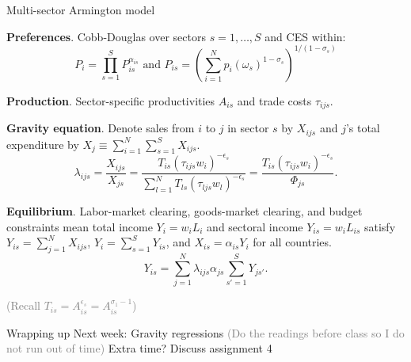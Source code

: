 \documentclass[10pt,notes=hide,aspectratio=169]{beamer}
\begin{document}
\begin{frame}{Multi-sector Armington model}
\begin{itemize}{\small
\item \textbf{Preferences}.
Cobb-Douglas over sectors $s = 1, \dots, S$ and CES within:
\begin{equation*}
P_i = \prod_{s=1}^S P_{is}^{\alpha_{is}} \text{ and } P_{is} = \left(\sum_{i=1}^{N} p_i(\omega_s)^{1-\sigma_s} \right)^{1/(1-\sigma_s)}
\end{equation*}
\item \textbf{Production}.
Sector-specific productivities $A_{is}$ and trade costs $\tau_{ijs}$.
\item \textbf{Gravity equation}.
Denote sales from $i$ to $j$ in sector $s$ by $X_{ijs}$ 
and $j$'s total expenditure by $X_j \equiv \sum_{i=1}^{N} \sum_{s=1}^{S} X_{ijs}$.
\begin{equation*}
\lambda_{ijs} = \frac{X_{ijs}}{X_{js}}
= \frac{T_{is} \left(\tau_{ijs}w_i\right)^{-\epsilon_s}}{\sum_{l=1}^{N} T_{ls}  \left(\tau_{ljs}w_l\right)^{-\epsilon_s}}
=\frac{T_{is} \left(\tau_{ijs}w_i\right)^{-\epsilon_s}}{\Phi_{js}}.
\end{equation*}
\item \textbf{Equilibrium}.
Labor-market clearing, goods-market clearing, and budget constraints mean
total income $Y_i = w_i L_i$ and sectoral income $Y_{is} = w_i L_{is}$ satisfy
$Y_{is} = \sum_{j=1}^{N} X_{ijs}$, $Y_i = \sum_{s=1}^{S} Y_{is}$, and $X_{is} = \alpha_{is} Y_i$ for all countries.
\begin{equation*}
	Y_{is} = \sum_{j=1}^{N} \lambda_{ijs} \alpha_{js} \sum_{s'=1}^{S} Y_{js'} .
\end{equation*}
}\end{itemize}
\textcolor{gray}{(Recall $T_{is} = A_{is}^{\epsilon_s} = A_{is}^{\sigma_1 - 1}$)}
\end{frame}
\begin{frame}{Wrapping up}
Next week: Gravity regressions
\textcolor{gray}{(Do the readings before class so I do not run out of time)}
\vspace{2cm}
Extra time? Discuss assignment 4
\end{frame}
\end{document}
